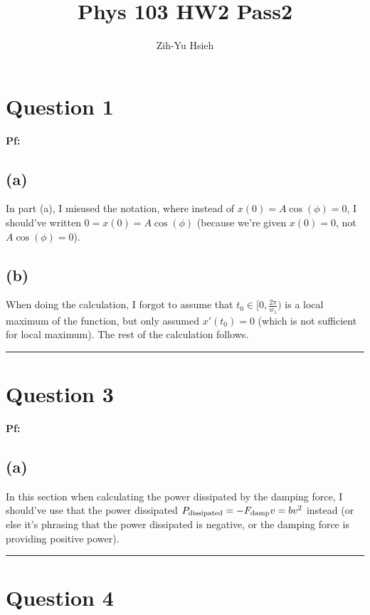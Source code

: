 \documentclass{article}
\title{Phys 103 HW2 Pass2}
\author{Zih-Yu Hsieh}
\begin{document}
\maketitle

\section*{Question 1}

\textbf{Pf:}
\subsection*{(a)}
In part (a), I misused the notation, where instead of $x(0)=A\cos(\phi)=0$, I should've written $0=x(0)=A\cos(\phi)$ (because we're given $x(0)=0$, not $A\cos(\phi)=0$).

\subsection*{(b)}
When doing the calculation, I forgot to assume that $t_0\in [0,\frac{2\pi}{w_1})$ is a local maximum of the function, but only assumed $x'(t_0)=0$ (which is not sufficient for local maximum). The rest of the calculation follows.

\hfil

\rule{15.6cm}{0.1mm}

\hfil

\section*{Question 3}

\textbf{Pf:}

\subsection*{(a)}
In this section when calculating the power dissipated by the damping force, I should've use that the power dissipated $P_\textmd{dissipated} = -F_\textmd{damp} v = bv^2$ instead (or else it's phrasing that the power dissipated is negative, or the damping force is providing positive power).

\hfil

\rule{15.6cm}{0.1mm}

\hfil

\section*{Question 4}
\end{document}
